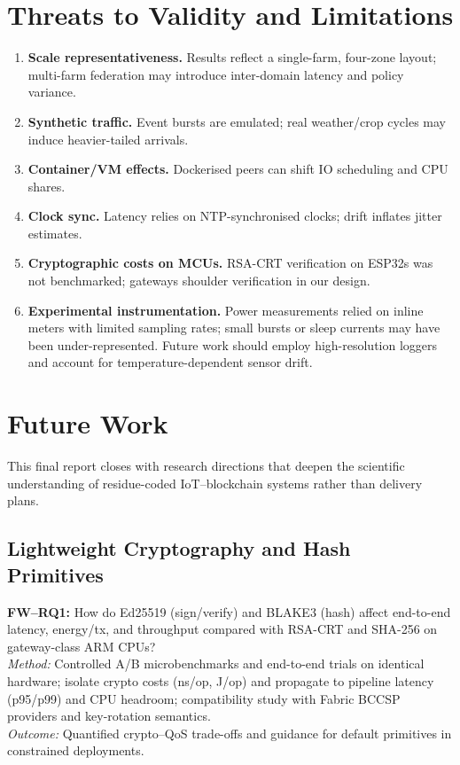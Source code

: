 \documentclass[12pt,onecolumn]{IEEEtran} %
\begin{document}
\section{Threats to Validity and Limitations}
\begin{enumerate}
  \item \textbf{Scale representativeness.} Results reflect a single-farm, four-zone layout; multi-farm federation may introduce inter-domain latency and policy variance.
  \item \textbf{Synthetic traffic.} Event bursts are emulated; real weather/crop cycles may induce heavier-tailed arrivals.
  \item \textbf{Container/VM effects.} Dockerised peers can shift IO scheduling and CPU shares.
  \item \textbf{Clock sync.} Latency relies on NTP-synchronised clocks; drift inflates jitter estimates.
  \item \textbf{Cryptographic costs on MCUs.} RSA-CRT verification on ESP32s was not benchmarked; gateways shoulder verification in our design.
  \item \textbf{Experimental instrumentation.} Power measurements relied on inline meters with limited sampling rates; small bursts or sleep currents may have been under-represented. Future work should employ high-resolution loggers and account for temperature-dependent sensor drift.
\end{enumerate}

\section{Future Work}
\label{sec:future-work}

This final report closes with research directions that deepen the scientific understanding of residue-coded IoT–blockchain systems rather than delivery plans.

\subsection{Lightweight Cryptography and Hash Primitives}
\textbf{FW–RQ1:} How do Ed25519 (sign/verify) and BLAKE3 (hash) affect end-to-end latency, energy/tx, and throughput compared with RSA-CRT and SHA-256 on gateway-class ARM CPUs? \\
\textit{Method:} Controlled A/B microbenchmarks and end-to-end trials on identical hardware; isolate crypto costs (ns/op, J/op) and propagate to pipeline latency (p95/p99) and CPU headroom; compatibility study with Fabric BCCSP providers and key-rotation semantics. \\
\textit{Outcome:} Quantified crypto–QoS trade-offs and guidance for default primitives in constrained deployments.
\end{document}
